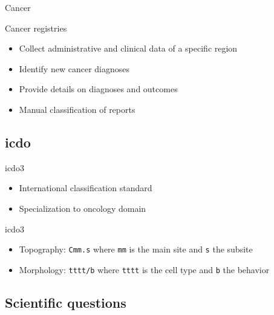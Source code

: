 \begin{frame}{Cancer}
  
\end{frame}

\begin{frame}{Cancer registries}
  \begin{itemize}
  \item \alert{Collect} administrative and clinical data of a specific region
  \item \alert{Identify} new cancer diagnoses
  \item Provide \alert{details} on diagnoses and outcomes 
  \item \alert{Manual} classification of reports
  \end{itemize}
\end{frame}

\subsection{\acs{icdo}}

\begin{frame}{\acs{icdo3}}
  \begin{itemize}
  \item International \alert{classification} standard
  \item Specialization to \alert{oncology} domain
  \end{itemize}
  \begin{block}{\acf{icdo3}}
      \begin{itemize}
      \item Topography: \texttt{Cmm.s} where \texttt{mm} is the
        \alert{main} site and \texttt{s} the \alert{subsite}
      \item Morphology: \texttt{tttt/b} where \texttt{tttt} is the
        cell \alert{type} and \texttt{b} the \alert{behavior}
      \end{itemize}
  \end{block}
\end{frame}

\subsection{Scientific questions}

